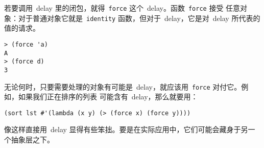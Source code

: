 若要调用~delay 里的闭包，就得~\texttt{force} 这个~delay。函数~\texttt{force} 接受
任意对象：对于普通对象它就是~\texttt{identity} 函数，但对于~delay，它是对~delay
所代表的值的请求。
\begin{lstlisting}
> (force 'a)
A
> (force d)
3
\end{lstlisting}
无论何时，只要需要处理的对象有可能是~delay，就应该用~\texttt{force} 对付它。例如，如果我们正在排序的列表
可能含有~delay，那么就要用：
\begin{lstlisting}
(sort lst #'(lambda (x y) (> (force x) (force y))))
\end{lstlisting}

像这样直接用~delay 显得有些笨拙。要是在实际应用中，它们可能会藏身于另一个抽象层之下。

